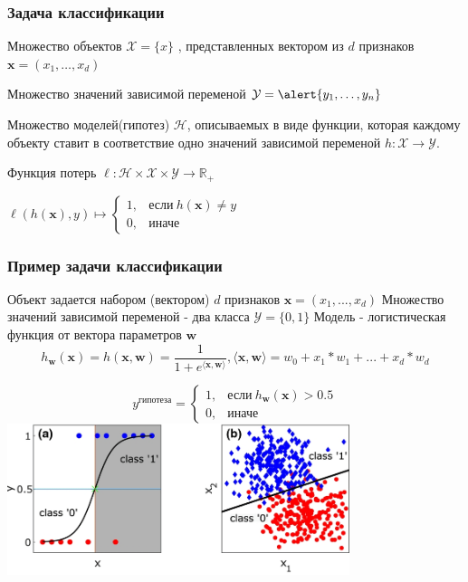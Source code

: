 \documentclass[notheorems]{beamer} %
\begin{document}
\begin{frame}
	\frametitle{Задача классификации}
	
	
	Множество объектов  $\mathcal{X}=\{x \}$ , представленных вектором из  $d$ признаков $\mathbf{x}=(x_1, \dots,x_d)$
	
	Множество значений зависимой переменой $\mathcal{Y}=\alert{y_1, \dots, y_n}$  
	
	Множество моделей(гипотез) $\mathcal{H}$, описываемых в виде функции, которая каждому объекту ставит в соответствие одно  значений зависимой переменой $h: \mathcal{X} \to \mathcal{Y}$.
	
	Функция потерь $ \ell:\mathcal{H} \times \mathcal{X} \times \mathcal{Y} \to \mathbb{R_+}$
	
	\alert{$      \ell(h(\textbf{x}),y) \mapsto
		\begin{cases}
		1, & \text{если}\ h(\textbf{x})\neq y \\
		0, & \text{иначе}
		\end{cases} $}
	
\end{frame}

\begin{frame}
	\frametitle{Пример задачи классификации}
	Объект задается набором (вектором) $d$ признаков $\textbf{x}=(x_1, ..., x_d)$
	Множество значений зависимой переменой - два класса $\mathcal{Y}=\{0,1\}$
	Модель - логистическая функция от вектора параметров $\textbf{w}$
	$$h_{\textbf{w}}(\textbf{x})=h(\textbf{x}, \textbf{w})=\frac{1}
	{1 + e^{\langle \textbf{x}, \textbf{w}\rangle}}, \langle \textbf{x},\textbf{w} \rangle = w_0 + x_1*w_1 + ... +x_d*w_d  $$
	
	$$ y^{\text{гипотеза}} =		\begin{cases}
	1, & \text{если} \ h_{\textbf{w}}(\textbf{x}) >0.5 \\
	0, & \text{иначе}
	\end{cases}$$
			\includegraphics[width=0.75\textwidth]{img/classification_example}
\end{frame}
\end{document}
